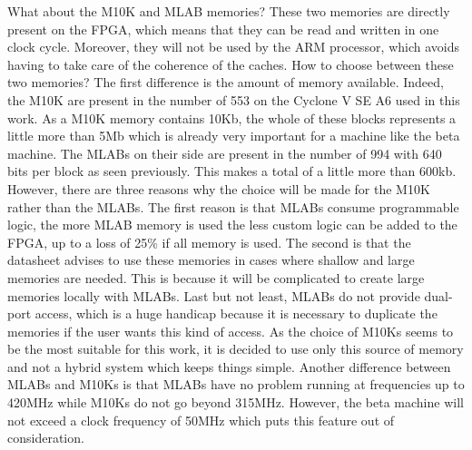 What about the M10K and MLAB memories? These two memories are directly present on the FPGA, which
 means that they can be read and written in one clock cycle. Moreover, they will not be used by the 
 ARM processor, which avoids having to take care of the coherence of the caches. How to choose 
 between these two memories? The first difference is the amount of memory available. Indeed, the 
 M10K are present in the number of 553 on the Cyclone V SE A6 used in this work. As a M10K memory 
 contains 10Kb, the whole of these blocks represents a little more than 5Mb which is already very 
 important for a machine like the beta machine. The MLABs on their side are present in the number of 
 994 with 640 bits per block as seen previously. This makes a total of a little more than 600kb. 
 However, there are three reasons why the choice will be made for the M10K rather than the MLABs. 
 The first reason is that MLABs consume programmable logic, the more MLAB memory is used the less 
 custom logic can be added to the FPGA, up to a loss of 25\% if all memory is used. The second is 
 that the datasheet advises to use these memories in cases where shallow and large memories are 
 needed. This is because it will be complicated to create large memories locally with MLABs. Last 
 but not least, MLABs do not provide dual-port access, which is a huge handicap because it is 
 necessary to duplicate the memories if the user wants this kind of access. As the choice of M10Ks 
 seems to be the most suitable for this work, it is decided to use only this source of memory and 
 not a hybrid system which keeps things simple. Another difference between MLABs and M10Ks is that 
 MLABs have no problem running at frequencies up to 420MHz while M10Ks do not go beyond 315MHz. 
 However, the beta machine will not exceed a clock frequency of 50MHz which puts this feature out 
 of consideration.